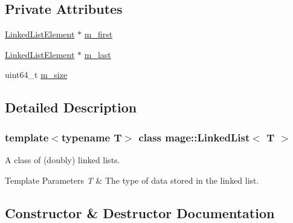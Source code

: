 \subsection*{Private Attributes}
\begin{DoxyCompactItemize}
\item 
\hyperlink{structmage_1_1_linked_list_1_1_linked_list_element}{Linked\+List\+Element} $\ast$ \hyperlink{classmage_1_1_linked_list_a194ecd23a82c83e2735717b32073340c}{m\+\_\+first}
\item 
\hyperlink{structmage_1_1_linked_list_1_1_linked_list_element}{Linked\+List\+Element} $\ast$ \hyperlink{classmage_1_1_linked_list_acb461a96b93fa3917b7ed2e30fe67fce}{m\+\_\+last}
\item 
uint64\+\_\+t \hyperlink{classmage_1_1_linked_list_a1a1be1f46f0bc704e6387833b9528909}{m\+\_\+size}
\end{DoxyCompactItemize}


\subsection{Detailed Description}
\subsubsection*{template$<$typename T$>$\newline
class mage\+::\+Linked\+List$<$ T $>$}

A class of (doubly) linked lists.


\begin{DoxyTemplParams}{Template Parameters}
{\em T} & The type of data stored in the linked list. \\
\hline
\end{DoxyTemplParams}


\subsection{Constructor \& Destructor Documentation}
\hypertarget{classmage_1_1_linked_list_a44b43c51b9515695016c8664d898aa6b}{}\label{classmage_1_1_linked_list_a44b43c51b9515695016c8664d898aa6b} 

